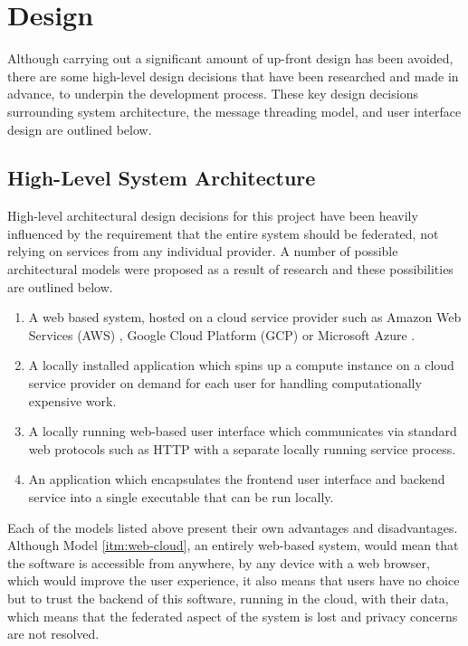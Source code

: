 \chapter{Design}

Although carrying out a significant amount of up-front design has been avoided, there are some high-level design decisions that have been researched and made in advance, to underpin the development process. These key design decisions surrounding system architecture, the message threading model, and user interface design are outlined below.

\section{High-Level System Architecture}\label{sec:high-level-architecture}

High-level architectural design decisions for this project have been heavily influenced by the requirement that the entire system should be federated, not relying on services from any individual provider. A number of possible architectural models were proposed as a result of research and these possibilities are outlined below.

\begin{enumerate}
  \item \label{itm:web-cloud} A web based system, hosted on a cloud service provider such as Amazon Web Services (AWS) \cite{aws}, Google Cloud Platform (GCP) \cite{gcp} or Microsoft Azure \cite{azure}.
  \item \label{itm:on-demand-cloud} A locally installed application which spins up a compute instance on a cloud service provider on demand for each user for handling computationally expensive work.
  \item \label{itm:local-service} A locally running web-based user interface which communicates via standard web protocols such as HTTP with a separate locally running service process.
  \item \label{itm:electron} An application which encapsulates the frontend user interface and backend service into a single executable that can be run locally.
\end{enumerate}

Each of the models listed above present their own advantages and disadvantages. Although Model \ref{itm:web-cloud}, an entirely web-based system, would mean that the software is accessible from anywhere, by any device with a web browser, which would improve the user experience, it also means that users have no choice but to trust the backend of this software, running in the cloud, with their data, which means that the federated aspect of the system is lost and privacy concerns are not resolved.

